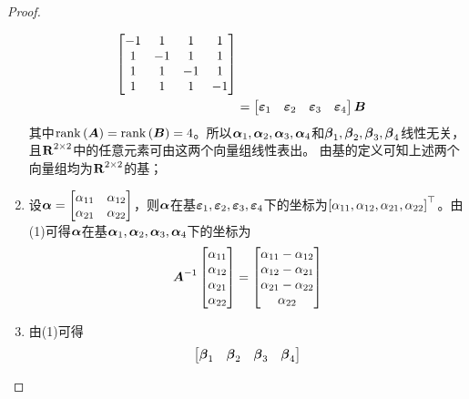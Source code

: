 \begin{proof}
\begin{enumerate}
{\begin{align*}
                  \begin{bmatrix}
                      -1 & 1  & 1  & 1  \\
                      1  & -1 & 1  & 1  \\
                      1  & 1  & -1 & 1  \\
                      1  & 1  & 1  & -1
                  \end{bmatrix}          \\
                   & =\begin{bmatrix}\boldsymbol{\varepsilon}_1&\boldsymbol{\varepsilon}_2&\boldsymbol{\varepsilon}_3&\boldsymbol{\varepsilon}_4\end{bmatrix}\boldsymbol{B}
              \end{align*}
              其中\(\mathrm{rank}\left( \boldsymbol{A} \right)=\mathrm{rank}\left( \boldsymbol{B} \right)=4\)。所以\(\boldsymbol{\alpha}_1,\boldsymbol{\alpha}_2,\boldsymbol{\alpha}_3,\boldsymbol{\alpha}_4\)和\(\boldsymbol{\beta}_1,\boldsymbol{\beta}_2,\boldsymbol{\beta}_3,\boldsymbol{\beta}_4\)线性无关，且\(\boldsymbol{\mathrm{R}}^{2\times2}\)中的任意元素可由这两个向量组线性表出。
              由基的定义可知上述两个向量组均为\(\boldsymbol{\mathrm{R}}^{2\times2}\)的基；
              }
        \item {
              设\(\boldsymbol{\alpha}=\begin{bmatrix}\alpha_{11}&\alpha_{12}\\\alpha_{21}&\alpha_{22}\end{bmatrix}\)，则\(\boldsymbol{\alpha}\)在基\(\boldsymbol{\varepsilon}_1,\boldsymbol{\varepsilon}_2,\boldsymbol{\varepsilon}_3,\boldsymbol{\varepsilon}_4\)下的坐标为\(\left[ \alpha_{11},\alpha_{12},\alpha_{21},\alpha_{22} \right]^\top\)。由(1)可得\(\boldsymbol{\alpha}\)在基\(\boldsymbol{\alpha}_1,\boldsymbol{\alpha}_2,\boldsymbol{\alpha}_3,\boldsymbol{\alpha}_4\)下的坐标为
              \begin{equation*}
                  {\boldsymbol{A}}^{-1}\begin{bmatrix}\alpha_{11}\\\alpha_{12}\\\alpha_{21}\\\alpha_{22}\end{bmatrix}=
                  \begin{bmatrix}\alpha_{11}-\alpha_{12}\\\alpha_{12}-\alpha_{21}\\\alpha_{21}-\alpha_{22}\\\alpha_{22}\end{bmatrix}
              \end{equation*}
              }
        \item {
              由(1)可得
              \begin{align*}
                  \begin{bmatrix}\vecbeta_1&\vecbeta_2&\vecbeta_3&\vecbeta_4\end{bmatrix}

\end{align*}}
\end{enumerate}
\end{proof}
